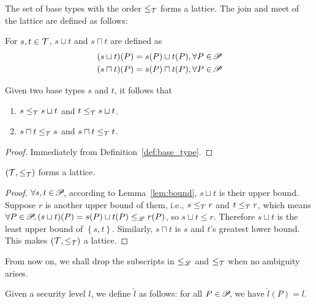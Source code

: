 {The set of base types with the order $\leq_{\mathcal{T}}$ forms a lattice. The join and meet
of the lattice are defined as follows:

\begin{definition}\label{def:type-cup-cap}
For $s, t\in\mathcal{T}$, $s\sqcup t$ and $s\sqcap t$ are defined as
\begin{align*}
(s\sqcup t)(P) =  s(P)\sqcup t(P), \forall P \in \!\mathscr{P}\!\\
(s\sqcap t)(P) =  s(P)\sqcap t(P), \forall P \in \!\mathscr{P}\!
\end{align*}
\end{definition}


\begin{lemma}\label{lem:bound}
Given two base types $s$ and $t$, it follows that
\begin{enumerate}[label*=(\alph*)]
\item $s \leq_{\mathcal{T}} s\sqcup t$ and $t\leq_{\mathcal{T}} s\sqcup t$.
\item $s\sqcap t \leq_{\mathcal{T}} s$ and $s\sqcap t \leq_{\mathcal{T}} t$.
\end{enumerate}
\end{lemma}
 \begin{proof}
Immediately from Definition~\ref{def:base_type}.
 \end{proof}


\begin{lemma}\label{lem:lattice}
$(\mathcal{T}, \leq_{\mathcal{T}})$ forms a lattice.
\end{lemma}
 \begin{proof}
 $\forall s,t\in\!\mathscr{P}\!$, according to Lemma~\ref{lem:bound}, $s \sqcup t$ is their upper bound. Suppose $r$ is another upper bound of them, i.e., $s\leq_{\mathcal{T}} r$ and $t\leq_{\mathcal{T}} r$, which means $\forall P\in\!\mathscr{P}\!, (s\sqcup t)(P)=s(P)\sqcup t(P)\leq_{\mathscr{L}} r(P)$, so $s\sqcup t\leq r$. Therefore $s\sqcup t$ is the least upper bound of $\left\{s,t\right\}$. Similarly, $s\sqcap t$ is $s$ and $t$'s greatest lower bound. This makes $(\mathcal{T}, \leq_{\mathcal{T}})$ a lattice.
 \end{proof}


From now on, we shall drop the subscripts in $\leq_{\mathscr{L}}$ and $\leq_{\mathcal{T}}$ when no ambiguity arises.



\begin{definition}
\label{def:embed}
Given a security level $l$, we define $\hat{l}$ as follows:
for all $P \in \!\mathscr{P}\!$, we have $\hat{l}(P) = l$.
\end{definition}

}
